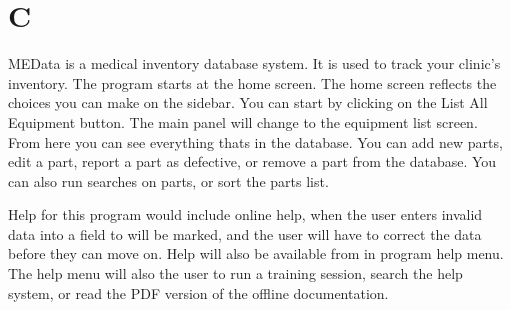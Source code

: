 \documentclass[16pt]{report}
\begin{document}
\chapter*{C}

MEData is a medical inventory database system.  It is used to track your clinic's inventory.  The program starts at the home screen.  The home screen reflects the choices you can make on the sidebar.  You can start by clicking on the List All Equipment button.  The main panel will change to the equipment list screen.  From here you can see everything thats in the database.  You can add new parts, edit a part, report a part as defective, or remove a part from the database.  You can also run searches on parts, or sort the parts list.

Help for this program would include online help, when the user enters invalid data into a field to will be marked, and the user will have to correct the data before they can move on.  Help will also be available from in program help menu.  The help menu will also the user to run a training session, search the help system, or read the PDF version of the offline documentation.
\end{document}
